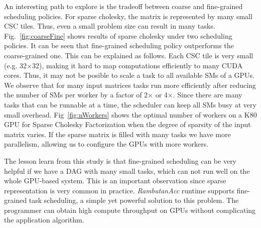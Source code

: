 An interesting path to explore is the tradeoff between coarse and fine-grained scheduling policies.  
For sparse cholesky, the matrix is represented by many small CSC tiles.
Thus, even a small problem size can result in many tasks.
Fig.~\ref{fig:coarseFine} shows results of sparse cholesky under two scheduling policies.
It can be seen that fine-grained scheduling policy outperforms the coarse-grained one.
This can be explained as follows.
Each CSC tile is very small (e.g. 32$\times$32), making it hard to map computations efficiently to many CUDA cores.
Thus, it may not be posible to scale a task to all available SMs of a GPUs.
We observe that for many input matrices tasks run more efficiently after reducing the number of SMs per worker by a factor of 2$\times$ or 4$\times$.
Since there are many tasks that can be runnable at a time, the scheduler can keep all SMs busy at very small overhead.
Fig~\ref{fig:nWorkers} shows the optimal number of workers on a K80 GPU for Sparse Cholesky Factorization when the degree of sparsity of the input matrix varies.
If the sparse matrix is filled with many tasks we have more parallelism, allowing us to configure the GPUs with more workers.

The lesson learn from this study is that fine-grained scheduling can be very helpful if we have a DAG with many small tasks, which can not run well on the whole GPU-based system.
This is an important observation since sparse representation is very common in practice.
{\em RambutanAcc} runtime supports fine-grained task scheduling, a simple yet powerful solution to this problem.
The programmer can obtain high compute throughput on GPUs without complicating the application algorithm.

